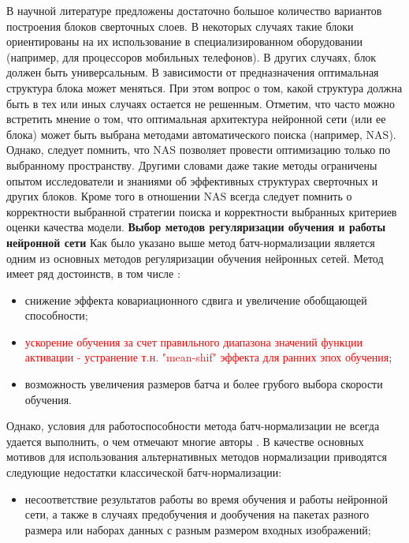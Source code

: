 \documentclass[12pt]{article}
\begin{document}
\begin{sloppypar}
В научной литературе предложены достаточно большое количество вариантов построения блоков сверточных слоев. В некоторых случаях такие блоки ориентированы на их использование в специализированном оборудовании (например, для процессоров мобильных телефонов). В других случаях, блок должен быть универсальным. В зависимости от предназначения оптимальная структура блока может меняться. При этом вопрос о том, какой структура должна быть в тех или иных случаях остается не решенным. 
Отметим, что часто можно встретить мнение о том, что оптимальная архитектура нейронной сети (или ее блока) может быть выбрана методами автоматического поиска (например, NAS). Однако, следует помнить, что NAS позволяет провести оптимизацию только по выбранному пространству. Другими словами даже такие методы ограничены опытом исследователи и знаниями об эффективных структурах сверточных и других блоков. Кроме того в отношении NAS всегда следует помнить о корректности выбранной стратегии поиска и корректности выбранных критериев оценки качества модели.
\newline
\noindent\textbf{Выбор методов регуляризации обучения и работы нейронной сети} 
Как было указано выше метод батч-нормализации является одним из основных методов регуляризации обучения нейронных сетей. Метод имеет ряд достоинств, в том числе \cite{brock2021high}: 
\begin{itemize} \itemsep 0.05em 
    \item снижение эффекта ковариационного сдвига и увеличение обобщающей способности; 
    \item \textcolor{red}{ускорение обучения за счет правильного диапазона значений функции активации - устранение т.н. "mean-shif" эффекта для ранних эпох обучения}; 
   \item  возможность увеличения размеров батча и более грубого выбора скорости обучения. 
\end{itemize} 
Однако, условия для работоспособности метода батч-нормализации не всегда удается выполнить, о чем отмечают многие авторы \cite{moradi2020survey, huang2020normalization, brock2021high}. 
В качестве основных мотивов для использования альтернативных методов нормализации 
приводятся следующие недостатки классической батч-нормализации:
\begin{itemize} \itemsep 0.05em  
    \item несоответствие результатов работы во время обучения и работы нейронной сети, а также в случаях предобучения и дообучения на пакетах разного размера или наборах данных с разным размером входных изображений;

\end{itemize}
\end{sloppypar}
\end{document}
